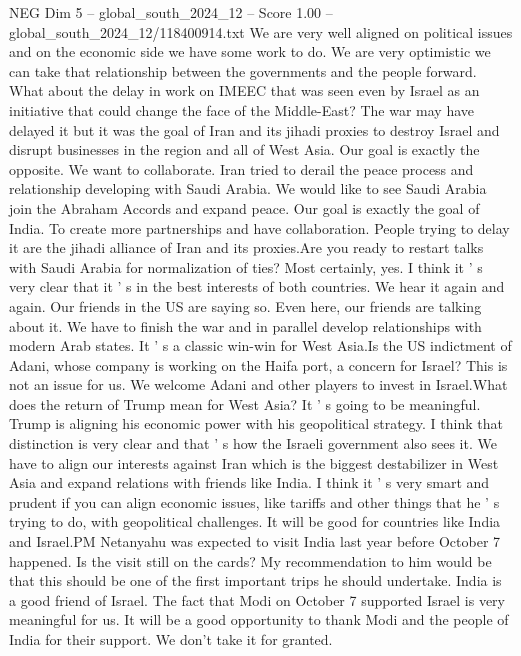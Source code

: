 \begin{textsample}{NEG Dim 5 – global\_south\_2024\_12 – Score 1.00 – global\_south\_2024\_12/118400914.txt}
We are very well aligned on political issues and on the economic side we have some work to do.
We are very optimistic we can take that relationship between the governments and the people forward.
What about the delay in work on IMEEC that was seen even by Israel as an initiative that could change the face of the Middle-East?
The war may have delayed it but it was the goal of Iran and its jihadi proxies to destroy Israel and disrupt businesses in the region and all of West Asia.
Our goal is exactly the opposite.
We want to collaborate.
Iran tried to derail the peace process and relationship developing with Saudi Arabia.
We would like to see Saudi Arabia join the Abraham Accords and expand peace.
Our goal is exactly the goal of India.
To create more partnerships and have collaboration.
People trying to delay it are the jihadi alliance of Iran and its proxies.Are you ready to restart talks with Saudi Arabia for normalization of ties?
Most certainly, yes.
I think it ' s very clear that it ' s in the best interests of both countries.
We hear it again and again.
Our friends in the US are saying so.
Even here, our friends are talking about it.
We have to finish the war and in parallel develop relationships with modern Arab states.
It ' s a classic win-win for West Asia.Is the US indictment of Adani, whose company is working on the Haifa port, a concern for Israel?
This is not an issue for us.
We welcome Adani and other players to invest in Israel.What does the return of Trump mean for West Asia?
It ' s going to be meaningful.
Trump is aligning his economic power with his geopolitical strategy.
I think that distinction is very clear and that ' s how the Israeli government also sees it.
We have to align our interests against Iran which is the biggest destabilizer in West Asia and expand relations with friends like India.
I think it ' s very smart and prudent if you can align economic issues, like tariffs and other things that he ' s trying to do, with geopolitical challenges.
It will be good for countries like India and Israel.PM Netanyahu was expected to visit India last year before October 7 happened.
Is the visit still on the cards?
My recommendation to him would be that this should be one of the first important trips he should undertake.
India is a good friend of Israel.
The fact that Modi on October 7 supported Israel is very meaningful for us.
It will be a good opportunity to thank Modi and the people of India for their support.
We don't take it for granted.

\end{textsample}
